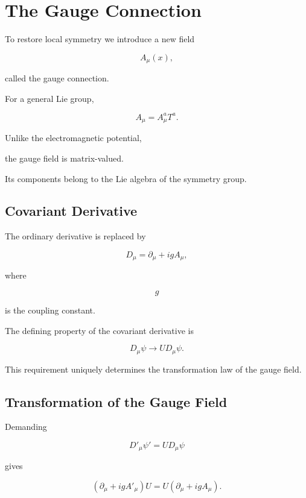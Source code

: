 \section{The Gauge Connection}

To restore local symmetry we introduce a new field

\[
A_\mu(x),
\]

called the gauge connection.

For a general Lie group,

\[
\boxed{
A_\mu
=
A_\mu^aT^a.
}
\]

Unlike the electromagnetic potential,

the gauge field is matrix-valued.

Its components belong to the Lie algebra of the symmetry group.


\subsection{Covariant Derivative}

The ordinary derivative is replaced by

\[
\boxed{
D_\mu
=
\partial_\mu
+
igA_\mu,
}
\]

where

\[
g
\]

is the coupling constant.

The defining property of the covariant derivative is

\[
\boxed{
D_\mu\psi
\rightarrow
UD_\mu\psi.
}
\]

This requirement uniquely determines the transformation law of the
gauge field.


\subsection{Transformation of the Gauge Field}

Demanding

\[
D'_\mu\psi'
=
UD_\mu\psi
\]

gives

\[
(\partial_\mu+igA'_\mu)U
=
U(\partial_\mu+igA_\mu).
\]

